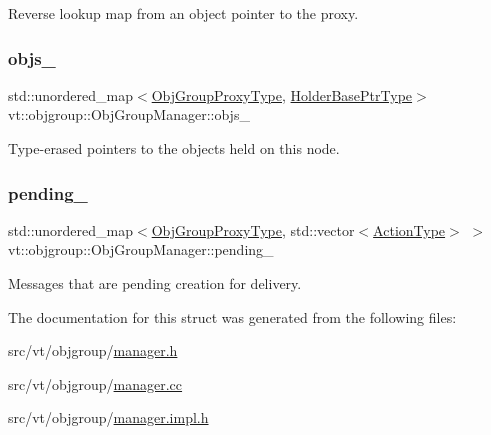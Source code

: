 Reverse lookup map from an object pointer to the proxy. 

\mbox{\label{structvt_1_1objgroup_1_1_obj_group_manager_abe842c221e7d99494a2323d4584428db}} 
\subsubsection{\texorpdfstring{objs\+\_\+}{objs\_}}
{\footnotesize\ttfamily std\+::unordered\+\_\+map$<$\hyperlink{namespacevt_ad7cae989df485fccca57f0792a880a8e}{Obj\+Group\+Proxy\+Type}, \hyperlink{structvt_1_1objgroup_1_1_obj_group_manager_ac1e9bb19d4a5923dd6d595bad28f04c9}{Holder\+Base\+Ptr\+Type}$>$ vt\+::objgroup\+::\+Obj\+Group\+Manager\+::objs\+\_\+\hspace{0.3cm}{\ttfamily [private]}}



Type-\/erased pointers to the objects held on this node. 

\mbox{\label{structvt_1_1objgroup_1_1_obj_group_manager_a5678a768bddd808a3b39d96e6843c81d}} 
\subsubsection{\texorpdfstring{pending\+\_\+}{pending\_}}
{\footnotesize\ttfamily std\+::unordered\+\_\+map$<$\hyperlink{namespacevt_ad7cae989df485fccca57f0792a880a8e}{Obj\+Group\+Proxy\+Type}, std\+::vector$<$\hyperlink{namespacevt_ae0a5a7b18cc99d7b732cb4d44f46b0f3}{Action\+Type}$>$ $>$ vt\+::objgroup\+::\+Obj\+Group\+Manager\+::pending\+\_\+\hspace{0.3cm}{\ttfamily [private]}}



Messages that are pending creation for delivery. 



The documentation for this struct was generated from the following files\+:\begin{DoxyCompactItemize}
\item 
src/vt/objgroup/\hyperlink{objgroup_2manager_8h}{manager.\+h}\item 
src/vt/objgroup/\hyperlink{objgroup_2manager_8cc}{manager.\+cc}\item 
src/vt/objgroup/\hyperlink{objgroup_2manager_8impl_8h}{manager.\+impl.\+h}\end{DoxyCompactItemize}
